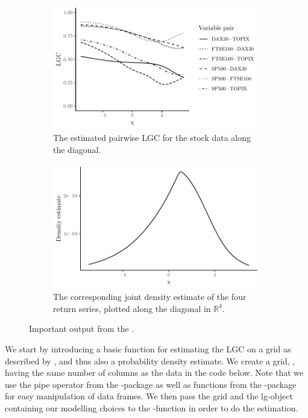 \begin{figure}[t]
    \centering
    \begin{subfigure}[t]{0.48\textwidth}
      \includegraphics[width=\textwidth]{loccor-example}
      \caption{The estimated pairwise LGC for the stock \newline data along the diagonal.}
      \label{fig:lgc-plot1}
    \end{subfigure}
    \begin{subfigure}[t]{0.48\textwidth}
      \includegraphics[width=\textwidth]{density-example}
      \caption{The corresponding joint density estimate of the four return series, plotted along the diagonal in $\mathbb{R}^4$.}
      \label{fig:lgc-plot2}
    \end{subfigure}
    \caption{Important output from the .}
    \label{fig:lgc-plot}
  \end{figure}

We start by introducing a basic function for estimating the LGC on a grid as described by \citet{otne:tjos:2017}, and thus also a probability density estimate. We create a grid, , having the same number of columns as the data in the code below. Note that we use the pipe operator \code{\%\textgreater{}\%} from the -package \citep{bach:wick:2014} as well as functions from the -package \citep{wick:fran:mull:2018} for easy manipulation of data frames. We then pass the grid and the lg-object containing our modelling choices to the -function in order to do the estimation.

